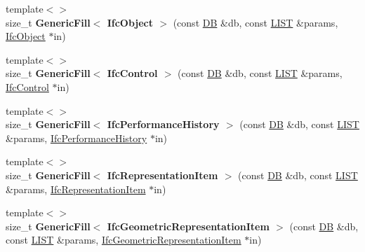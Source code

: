 \begin{DoxyCompactItemize}
\item 
\hypertarget{namespace_assimp_1_1_s_t_e_p_aa89c329852e0ec56443afd127bbbf578}{{\footnotesize template$<$$>$ }\\size\+\_\+t {\bfseries Generic\+Fill$<$ Ifc\+Object $>$} (const \hyperlink{class_assimp_1_1_s_t_e_p_1_1_d_b}{D\+B} \&db, const \hyperlink{class_assimp_1_1_s_t_e_p_1_1_e_x_p_r_e_s_s_1_1_l_i_s_t}{L\+I\+S\+T} \&params, \hyperlink{struct_assimp_1_1_i_f_c_1_1_ifc_object}{Ifc\+Object} $\ast$in)}\label{namespace_assimp_1_1_s_t_e_p_aa89c329852e0ec56443afd127bbbf578}

\item 
\hypertarget{namespace_assimp_1_1_s_t_e_p_aab150b9bb03eba02786cdb348f832523}{{\footnotesize template$<$$>$ }\\size\+\_\+t {\bfseries Generic\+Fill$<$ Ifc\+Control $>$} (const \hyperlink{class_assimp_1_1_s_t_e_p_1_1_d_b}{D\+B} \&db, const \hyperlink{class_assimp_1_1_s_t_e_p_1_1_e_x_p_r_e_s_s_1_1_l_i_s_t}{L\+I\+S\+T} \&params, \hyperlink{struct_assimp_1_1_i_f_c_1_1_ifc_control}{Ifc\+Control} $\ast$in)}\label{namespace_assimp_1_1_s_t_e_p_aab150b9bb03eba02786cdb348f832523}

\item 
\hypertarget{namespace_assimp_1_1_s_t_e_p_a5bca5cbe87a18ff6f086b01617a56f0c}{{\footnotesize template$<$$>$ }\\size\+\_\+t {\bfseries Generic\+Fill$<$ Ifc\+Performance\+History $>$} (const \hyperlink{class_assimp_1_1_s_t_e_p_1_1_d_b}{D\+B} \&db, const \hyperlink{class_assimp_1_1_s_t_e_p_1_1_e_x_p_r_e_s_s_1_1_l_i_s_t}{L\+I\+S\+T} \&params, \hyperlink{struct_assimp_1_1_i_f_c_1_1_ifc_performance_history}{Ifc\+Performance\+History} $\ast$in)}\label{namespace_assimp_1_1_s_t_e_p_a5bca5cbe87a18ff6f086b01617a56f0c}

\item 
\hypertarget{namespace_assimp_1_1_s_t_e_p_a8b1b5078d8b151535deab15dd84794c8}{{\footnotesize template$<$$>$ }\\size\+\_\+t {\bfseries Generic\+Fill$<$ Ifc\+Representation\+Item $>$} (const \hyperlink{class_assimp_1_1_s_t_e_p_1_1_d_b}{D\+B} \&db, const \hyperlink{class_assimp_1_1_s_t_e_p_1_1_e_x_p_r_e_s_s_1_1_l_i_s_t}{L\+I\+S\+T} \&params, \hyperlink{struct_assimp_1_1_i_f_c_1_1_ifc_representation_item}{Ifc\+Representation\+Item} $\ast$in)}\label{namespace_assimp_1_1_s_t_e_p_a8b1b5078d8b151535deab15dd84794c8}

\item 
\hypertarget{namespace_assimp_1_1_s_t_e_p_af8c06446789bcf1042bf9d3b01465981}{{\footnotesize template$<$$>$ }\\size\+\_\+t {\bfseries Generic\+Fill$<$ Ifc\+Geometric\+Representation\+Item $>$} (const \hyperlink{class_assimp_1_1_s_t_e_p_1_1_d_b}{D\+B} \&db, const \hyperlink{class_assimp_1_1_s_t_e_p_1_1_e_x_p_r_e_s_s_1_1_l_i_s_t}{L\+I\+S\+T} \&params, \hyperlink{struct_assimp_1_1_i_f_c_1_1_ifc_geometric_representation_item}{Ifc\+Geometric\+Representation\+Item} $\ast$in)}\label{namespace_assimp_1_1_s_t_e_p_af8c06446789bcf1042bf9d3b01465981}


\end{DoxyCompactItemize}
